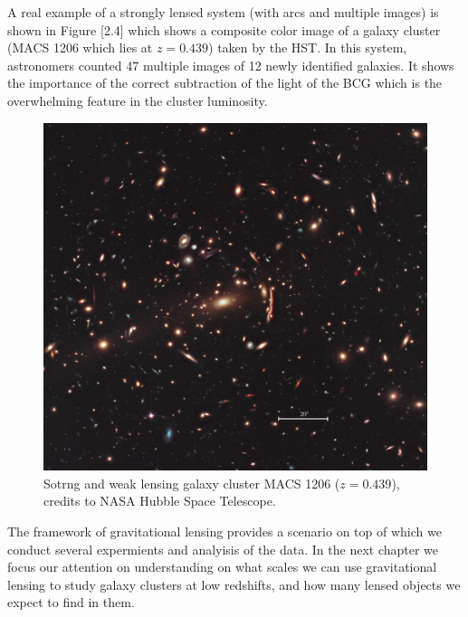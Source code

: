A real example of a strongly lensed system (with arcs and multiple images) is shown in Figure [2.4] which shows a composite color image of a galaxy cluster (MACS 1206 which lies at $z=0.439$) taken by the HST. In this system, astronomers counted 47 multiple images of 12 newly identified galaxies. It shows the importance of the correct subtraction of the light of the BCG which is the overwhelming feature in the cluster luminosity. 

\begin{figure}[H]
\centering
\includegraphics[width=12cm]{images/GC.jpg}
\caption[Galaxy Cluster MACS 1206]{Sotrng and weak lensing galaxy cluster MACS 1206 ($z=0.439$), credits to NASA Hubble Space Telescope.}
\end{figure}

The framework of gravitational lensing provides a scenario on top of which we conduct several expermients and analyisis of the data. In the next chapter we focus our attention on understanding on what scales we can use gravitational lensing to study galaxy clusters at low redshifts, and how many lensed objects we expect to find in them.